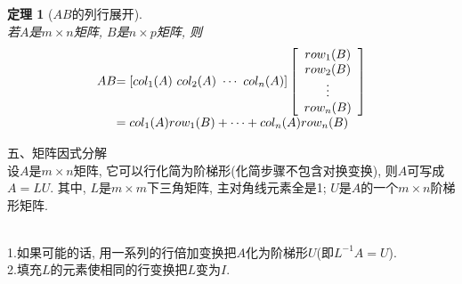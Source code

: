 \documentclass[UTF8,fontset=ubuntu]{ctexart}
\theoremstyle{plain}
\newtheorem{theorem}{定理}
\theoremstyle{nonumberplain}
\theoremstyle{empty}
\begin{document}
\begin{theorem}[$AB$的列行展开]\ \\
若$A$是$m\times n$矩阵, $B$是$n\times p$矩阵, 则
\[\begin{array}{l@{}l}
AB & =[col_1(A)\ col_2(A)\ \cdots\ col_n(A)]\left[
\begin{array}{c}
row_1(B)\\
row_2(B)\\
\vdots\\
row_n(B)
\end{array}
\right]\\
& =col_1(A)row_1(B)+\cdots+col_n(A)row_n(B)
\end{array}\]
\end{theorem}\vspace{6ex}

五、矩阵因式分解\\[1ex]
设$A$是$m\times n$矩阵, 它可以行化简为阶梯形(化简步骤不包含对换变换), 则$A$可写成$A=LU$. 其中, $L$是$m\times m$下三角矩阵, 主对角线元素全是1; $U$是$A$的一个$m\times n$阶梯形矩阵.\\[2ex]

\begin{law}[$LU$分解的算法]\ \\
1.如果可能的话, 用一系列的行倍加变换把$A$化为阶梯形$U$(即$L^{-1}A=U$).\\
2.填充$L$的元素使相同的行变换把$L$变为$I$.
\end{law}\vspace{2ex}
\end{document}
